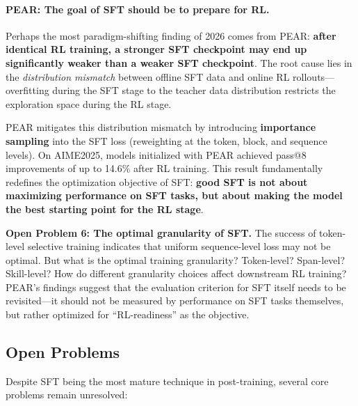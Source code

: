 \paragraph{PEAR: The goal of SFT should be to prepare for RL.}
Perhaps the most paradigm-shifting finding of 2026 comes from PEAR:
\textbf{after identical RL training, a stronger SFT checkpoint may end up significantly weaker than a weaker SFT checkpoint}.
The root cause lies in the \emph{distribution mismatch} between offline SFT data and online RL rollouts---overfitting
during the SFT stage to the teacher data distribution
restricts the exploration space during the RL stage.

PEAR mitigates this distribution mismatch by introducing \textbf{importance sampling}
into the SFT loss (reweighting at the token, block, and sequence levels).
On AIME2025, models initialized with PEAR achieved
pass@8 improvements of up to 14.6\% after RL training.
This result fundamentally redefines the optimization objective of SFT:
\textbf{good SFT is not about maximizing performance on SFT tasks,
but about making the model the best starting point for the RL stage}.

\begin{openproblembox}
\textbf{Open Problem 6: The optimal granularity of SFT.}
The success of token-level selective training indicates that
uniform sequence-level loss may not be optimal.
But what is the optimal training granularity?
Token-level? Span-level? Skill-level?
How do different granularity choices affect downstream RL training?
PEAR's findings suggest that the evaluation criterion for SFT itself needs to be revisited---it
should not be measured by performance on SFT tasks themselves,
but rather optimized for ``RL-readiness'' as the objective.
\end{openproblembox}

\subsection{Open Problems}
\label{sec:t1-open}

Despite SFT being the most mature technique in post-training, several core problems remain unresolved:

